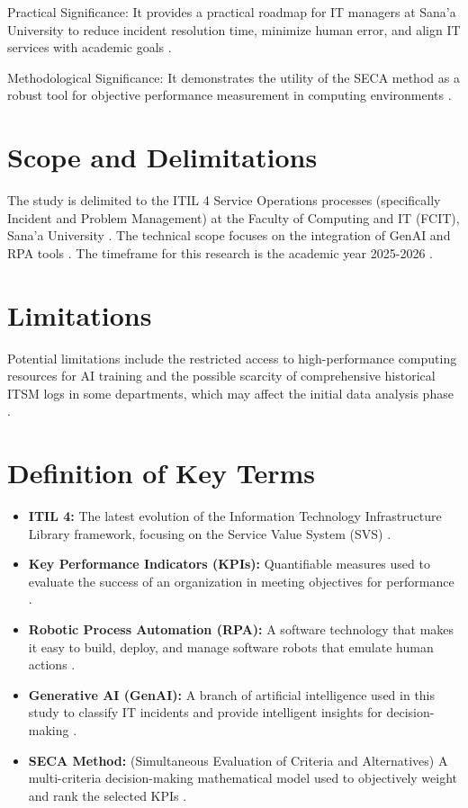 \documentclass[12pt,a4paper,oneside]{report}
\begin{document}
Practical Significance: It provides a practical roadmap for IT managers at Sana'a University to reduce incident resolution time, minimize human error, and align IT services with academic goals \cite{almontaser2025}.

Methodological Significance: It demonstrates the utility of the SECA method as a robust tool for objective performance measurement in computing environments \cite{almontaser2025}.

\section{Scope and Delimitations}
The study is delimited to the ITIL 4 Service Operations processes (specifically Incident and Problem Management) at the Faculty of Computing and IT (FCIT), Sana'a University \cite{almontaser2025}. The technical scope focuses on the integration of GenAI and RPA tools \cite{almontaser2025}. The timeframe for this research is the academic year 2025-2026 \cite{almontaser2025}.

\section{Limitations}
Potential limitations include the restricted access to high-performance computing resources for AI training and the possible scarcity of comprehensive historical ITSM logs in some departments, which may affect the initial data analysis phase \cite{almontaser2025}.

\section{Definition of Key Terms}
\begin{itemize}
    \item \textbf{ITIL 4:} The latest evolution of the Information Technology Infrastructure Library framework, focusing on the Service Value System (SVS) \cite{almontaser2025}.
    \item \textbf{Key Performance Indicators (KPIs):} Quantifiable measures used to evaluate the success of an organization in meeting objectives for performance \cite{almontaser2025}.
    \item \textbf{Robotic Process Automation (RPA):} A software technology that makes it easy to build, deploy, and manage software robots that emulate human actions \cite{almontaser2025}.
    \item \textbf{Generative AI (GenAI):} A branch of artificial intelligence used in this study to classify IT incidents and provide intelligent insights for decision-making \cite{almontaser2025}.
    \item \textbf{SECA Method:} (Simultaneous Evaluation of Criteria and Alternatives) A multi-criteria decision-making mathematical model used to objectively weight and rank the selected KPIs \cite{almontaser2025}.
\end{itemize}
\end{document}
